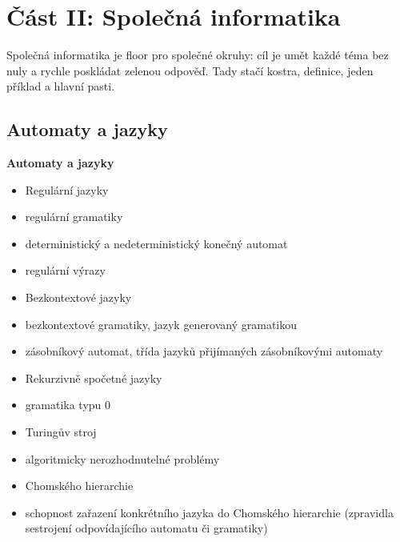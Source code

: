 \section{Část II: Společná informatika}

{\small Společná informatika je floor pro společné okruhy: cíl je umět každé téma
bez nuly a rychle poskládat zelenou odpověď. Tady stačí kostra, definice, jeden příklad
a hlavní pasti.}

\subsection{Automaty a jazyky}

\begin{tema}
\textbf{Automaty a jazyky}
\begin{itemize}[leftmargin=1.2em,itemsep=0pt,topsep=1pt]
  \item Regulární jazyky
  \item regulární gramatiky
  \item deterministický a nedeterministický konečný automat
  \item regulární výrazy
  \item Bezkontextové jazyky
  \item bezkontextové gramatiky, jazyk generovaný gramatikou
  \item zásobníkový automat, třída jazyků přijímaných zásobníkovými automaty
  \item Rekurzivně spočetné jazyky
  \item gramatika typu 0
  \item Turingův stroj
  \item algoritmicky nerozhodnutelné problémy
  \item Chomského hierarchie
  \item schopnost zařazení konkrétního jazyka do Chomského hierarchie (zpravidla sestrojení odpovídajícího automatu či gramatiky)
\end{itemize}
\end{tema}
\begin{vezkratce}
\end{vezkratce}

